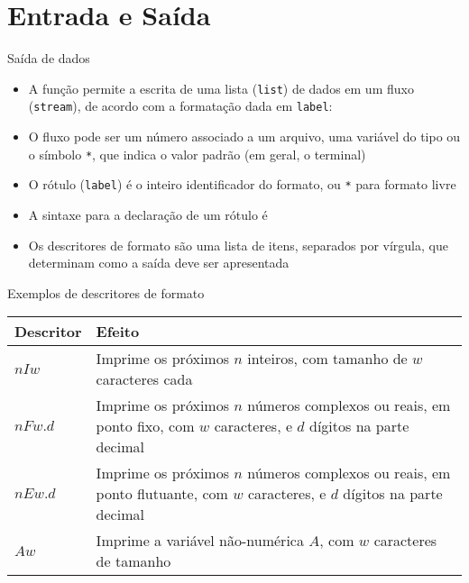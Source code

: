 \section{Entrada e Saída}

\begin{frame}[fragile]{Saída de dados}

    \begin{itemize}
        \item A função  permite a escrita de uma lista (\texttt{list})
            de dados em um fluxo (\texttt{stream}), de acordo com a formatação dada em 
            \texttt{label}:


        \item O fluxo pode ser um número associado a um arquivo, uma variável do tipo 
             ou o símbolo \texttt{*}, que indica o valor padrão (em geral,
            o terminal)

        \item O rótulo (\texttt{label}) é o inteiro identificador do formato, ou \texttt{*} para
            formato livre 

        \item A sintaxe para a declaração de um rótulo é


        \item Os descritores de formato são uma lista de itens, separados por vírgula, que 
            determinam como a saída deve ser apresentada

    \end{itemize}

\end{frame}

\begin{frame}[fragile]{Exemplos de descritores de formato}

    \begin{table}[ht]
        \centering
        \begin{tabularx}{0.95\textwidth}{lX}
            \toprule
            \textbf{Descritor} & \textbf{Efeito} \\
            \midrule
            $nIw$ & Imprime os próximos $n$ inteiros, com tamanho de $w$ caracteres cada \\
            \rowcolor[gray]{0.9}
            $nFw.d$ & Imprime os próximos $n$ números complexos ou reais, em ponto fixo,
                com $w$ caracteres, e $d$ dígitos na parte decimal \\ 
            $nEw.d$ & Imprime os próximos $n$ números complexos ou reais, em ponto flutuante,
                com $w$ caracteres, e $d$ dígitos na parte decimal \\ 
            \rowcolor[gray]{0.9}
            $Aw$ & Imprime a variável não-numérica $A$, com $w$ caracteres de tamanho \\
            \bottomrule
        \end{tabularx}
    \end{table}

\end{frame}

